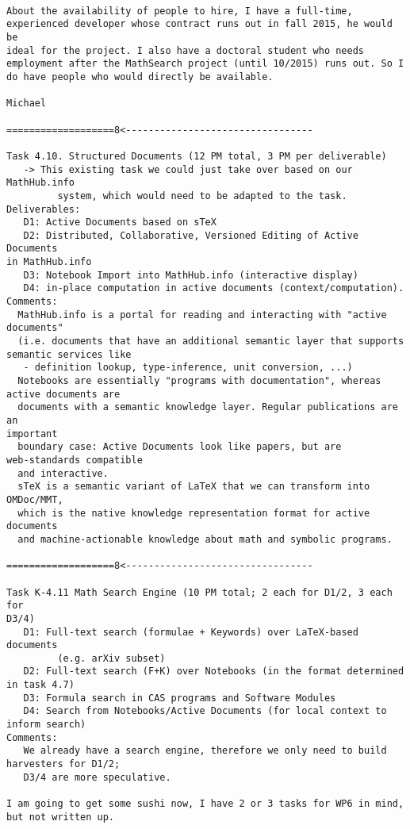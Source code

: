 \begin{verbatim}

About the availability of people to hire, I have a full-time,
experienced developer whose contract runs out in fall 2015, he would be
ideal for the project. I also have a doctoral student who needs
employment after the MathSearch project (until 10/2015) runs out. So I
do have people who would directly be available.

Michael

===================8<---------------------------------

Task 4.10. Structured Documents (12 PM total, 3 PM per deliverable)
   -> This existing task we could just take over based on our MathHub.info
         system, which would need to be adapted to the task.
Deliverables:
   D1: Active Documents based on sTeX
   D2: Distributed, Collaborative, Versioned Editing of Active Documents
in MathHub.info
   D3: Notebook Import into MathHub.info (interactive display)
   D4: in-place computation in active documents (context/computation).
Comments:
  MathHub.info is a portal for reading and interacting with "active
documents"
  (i.e. documents that have an additional semantic layer that supports
semantic services like
   - definition lookup, type-inference, unit conversion, ...)
  Notebooks are essentially "programs with documentation", whereas
active documents are
  documents with a semantic knowledge layer. Regular publications are an
important
  boundary case: Active Documents look like papers, but are
web-standards compatible
  and interactive.
  sTeX is a semantic variant of LaTeX that we can transform into OMDoc/MMT,
  which is the native knowledge representation format for active documents
  and machine-actionable knowledge about math and symbolic programs.

===================8<---------------------------------

Task K-4.11 Math Search Engine (10 PM total; 2 each for D1/2, 3 each for
D3/4)
   D1: Full-text search (formulae + Keywords) over LaTeX-based documents
         (e.g. arXiv subset)
   D2: Full-text search (F+K) over Notebooks (in the format determined
in task 4.7)
   D3: Formula search in CAS programs and Software Modules
   D4: Search from Notebooks/Active Documents (for local context to
inform search)
Comments:
   We already have a search engine, therefore we only need to build
harvesters for D1/2;
   D3/4 are more speculative.

I am going to get some sushi now, I have 2 or 3 tasks for WP6 in mind,
but not written up.

\end{verbatim}

